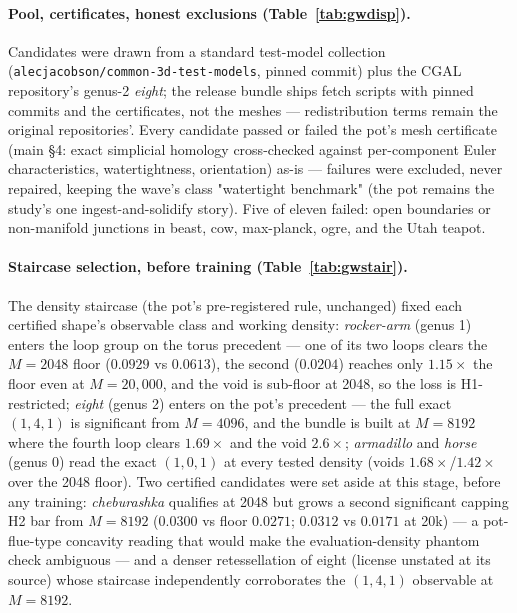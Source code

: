 \paragraph{Pool, certificates, honest exclusions (Table~\ref{tab:gwdisp}).}
Candidates were drawn from a standard test-model collection
(\texttt{alecjacobson/common-3d-test-models}, pinned commit) plus the
CGAL repository's genus-2 \emph{eight}; the release bundle ships fetch
scripts with pinned commits and the certificates, not the meshes ---
redistribution terms remain the original repositories'.
Every candidate passed or failed the pot's mesh certificate (main \S4:
exact simplicial homology cross-checked against per-component Euler
characteristics, watertightness, orientation) as-is --- failures were
excluded, never repaired, keeping the wave's class "watertight
benchmark" (the pot remains the study's one ingest-and-solidify story).
Five of eleven failed: open boundaries or non-manifold junctions in
beast, cow, max-planck, ogre, and the Utah teapot.

\paragraph{Staircase selection, before training (Table~\ref{tab:gwstair}).}
The density staircase (the pot's pre-registered rule, unchanged) fixed
each certified shape's observable class and working density:
\emph{rocker-arm} (genus 1) enters the loop group on the torus
precedent --- one of its two loops clears the $M{=}2048$ floor
($0.0929$ vs $0.0613$), the second ($0.0204$) reaches only
$1.15\times$ the floor even at $M{=}20{,}000$, and the void is
sub-floor at 2048, so the loss is H1-restricted;
\emph{eight} (genus 2) enters on the pot's precedent --- the full
exact $(1,4,1)$ is significant from $M{=}4096$, and the bundle is
built at $M{=}8192$ where the fourth loop clears $1.69\times$ and the
void $2.6\times$; \emph{armadillo} and \emph{horse} (genus 0) read the
exact $(1,0,1)$ at every tested density (voids $1.68\times$/$1.42\times$
over the 2048 floor).
Two certified candidates were set aside at this stage, before any
training: \emph{cheburashka} qualifies at 2048 but grows a second
significant capping H2 bar from $M{=}8192$ ($0.0300$ vs floor $0.0271$;
$0.0312$ vs $0.0171$ at 20k) --- a pot-flue-type concavity reading that
would make the evaluation-density phantom check ambiguous --- and a
denser retessellation of eight (license unstated at its source) whose
staircase independently corroborates the $(1,4,1)$ observable at
$M{=}8192$.


